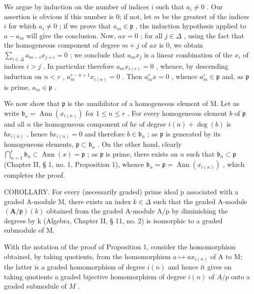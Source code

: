 We argue by induction on the number of indices \(i\) such that \(a_{i} \neq 0\) . Our assertion is obvious if this number is 0; if not, let \(m\) be the greatest of the indices \(i\) for which \(a_{i} \neq 0\) ; if we prove that \(a_{m} \in \mathfrak{p}\) , the induction hypothesis applied to \(a - a_{m}\) will give the conclusion. Now, \(ax = 0\) ; for all \(j \in \Delta\) , using the fact that the homogeneous component of degree \(m + j\) of \(ax\) is 0, we obtain \(\sum_{i \in \Delta} a_{m - i} x_{j + i} = 0\) ; we conclude that \(a_{m} x_{j}\) is a linear combination of the \(x_{i}\) of indices \(i > j\) . In particular therefore \(a_{m} x_{i(r)} = 0\) , whence, by descending induction on \(n < r\) , \(a_{m}^{r - n + 1} x_{i(n)} = 0\) . Then \(a_{m}^{r} x = 0\) , whence \(a_{m}^{r} \in \mathfrak{p}\) and, as \(\mathfrak{p}\) is prime, \(a_{m} \in \mathfrak{p}\) .

We now show that \(\mathfrak{p}\) is the annihilator of a homogeneous element of M. Let us write \(\mathfrak{b}_n = \operatorname{Ann}(x_{i(n)})\) for \(1 \leqslant n \leqslant r\) . For every homogeneous element \(b\) of \(\mathfrak{p}\) and all \(n\) the homogeneous component of \(bx\) of degree \(i(n) + \deg(b)\) is \(bx_{i(n)}\) , hence \(bx_{i(n)} = 0\) and therefore \(b \in \mathfrak{b}_n\) ; as \(\mathfrak{p}\) is generated by its homogeneous elements, \(\mathfrak{p} \subset \mathfrak{b}_n\) . On the other hand, clearly \(\bigcap_{n=1}^{r} \mathfrak{b}_n \subset \operatorname{Ann}(x) = \mathfrak{p}\) ; as \(\mathfrak{p}\) is prime, there exists an \(n\) such that \(\mathfrak{b}_n \subset \mathfrak{p}\) (Chapter II, § 1, no. 1, Proposition 1), whence \(\mathfrak{b}_n = \mathfrak{p} = \operatorname{Ann}(x_{i(n)})\) , which completes the proof.

COROLLARY. For every (necessarily graded) prime ideal p associated with a graded A-module M, there exists an index \(k \in \Delta\) such that the graded A-module \((\mathbf{A}/\mathfrak{p})(k)\) obtained from the graded A-module A/p by diminishing the degrees by k (Algebra, Chapter II, § 11, no. 2) is isomorphic to a graded submodule of M.

With the notation of the proof of Proposition 1, consider the homomorphism obtained, by taking quotients, from the homomorphism \(a \mapsto ax_{i(n)}\) of A to M; the latter is a graded homomorphism of degree \(i(n)\) and hence it gives on taking quotients a graded bijective homomorphism of degree \(i(n)\) of \(A / p\) onto a graded submodule of \(M\) .

